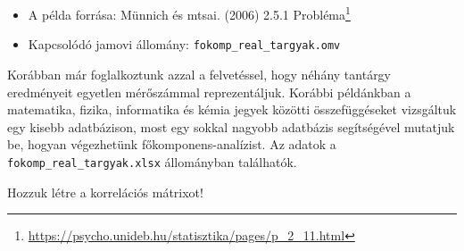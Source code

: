 \documentclass[
  letterpaper,
]{krantz}
\makeatletter
\newenvironment{Shaded}{\begin{snugshade}}{\end{snugshade}}
\newcommand{\AttributeTok}[1]{\textcolor[rgb]{0.40,0.45,0.13}{#1}}
\newcommand{\CommentTok}[1]{\textcolor[rgb]{0.37,0.37,0.37}{#1}}
\newcommand{\FunctionTok}[1]{\textcolor[rgb]{0.28,0.35,0.67}{#1}}
\newcommand{\NormalTok}[1]{\textcolor[rgb]{0.00,0.23,0.31}{#1}}
\newcommand{\OtherTok}[1]{\textcolor[rgb]{0.00,0.23,0.31}{#1}}
\newcommand{\SpecialCharTok}[1]{\textcolor[rgb]{0.37,0.37,0.37}{#1}}
\newcommand{\StringTok}[1]{\textcolor[rgb]{0.13,0.47,0.30}{#1}}
\providecommand{\tightlist}{%
  \setlength{\itemsep}{0pt}\setlength{\parskip}{0pt}}\usepackage{longtable,booktabs,array}
\renewcommand{\href}[2]{#2\footnote{\url{#1}}}
\newenvironment{kframe}{%
\medskip{}
\setlength{\fboxsep}{.8em}
 \def\at@end@of@kframe{}%
 \ifinner\ifhmode%
  \def\at@end@of@kframe{\end{minipage}}%
  \begin{minipage}{\columnwidth}%
 \fi\fi%
 \def\FrameCommand##1{\hskip\@totalleftmargin \hskip-\fboxsep
 \colorbox{shadecolor}{##1}\hskip-\fboxsep
     \hskip-\linewidth \hskip-\@totalleftmargin \hskip\columnwidth}%
 \MakeFramed {\advance\hsize-\width
   \@totalleftmargin\z@ \linewidth\hsize
   \@setminipage}}%
 {\par\unskip\endMakeFramed%
 \at@end@of@kframe}
\renewenvironment{Shaded}{\begin{kframe}}{\end{kframe}}
\makeatother
\begin{document}
\begin{itemize}
\tightlist
\item
  A példa forrása: Münnich és mtsai. (2006)
  \href{https://psycho.unideb.hu/statisztika/pages/p_2_11.html}{2.5.1
  Probléma}
\item
  Kapcsolódó jamovi állomány: \texttt{fokomp\_real\_targyak.omv}
\end{itemize}

Korábban már foglalkoztunk azzal a felvetéssel, hogy néhány tantárgy
eredményeit egyetlen mérőszámmal reprezentáljuk. Korábbi példánkban a
matematika, fizika, informatika és kémia jegyek közötti összefüggéseket
vizsgáltuk egy kisebb adatbázison, most egy sokkal nagyobb adatbázis
segítségével mutatjuk be, hogyan végezhetünk főkomponens-analízist. Az
adatok a \texttt{fokomp\_real\_targyak.xlsx} állományban találhatók.

\begin{Shaded}
\end{Shaded}

Hozzuk létre a korrelációs mátrixot!
\end{document}
